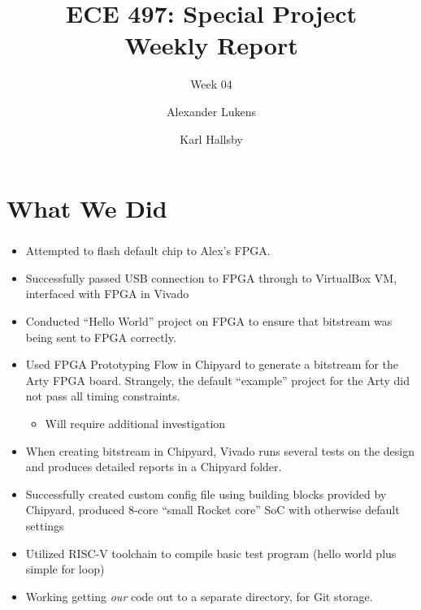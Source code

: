 \documentclass{../weeklyslides}
\title[Weekly Report]{ECE 497: Special Project \\ Weekly Report}
\subtitle{Week 04}
\author{Alexander Lukens \and Karl Hallsby}
\institute{Illinois Institute of Technology}
\date{\DTMdisplaydate{2021}{2}{18}{-1}}
\begin{document}
\nocite{chipyard}

\begin{frame}
  \titlepage{}
\end{frame}

\section{What We Did}\label{sec:What_We_Did}
\begin{frame}
  \frametitle{}
  \begin{itemize}
  \item Attempted to flash default chip to Alex's FPGA.\@
  \item Successfully passed USB connection to FPGA through to VirtualBox VM, interfaced with FPGA in Vivado
  \item Conducted ``Hello World'' project on FPGA to ensure that bitstream was being sent to FPGA correctly.
  \item Used FPGA Prototyping Flow in Chipyard to generate a bitstream for the Arty FPGA board.
    Strangely, the default ``example'' project for the Arty did not pass all timing constraints.
    \begin{itemize}
    \item Will require additional investigation
    \end{itemize}
  \item When creating bitstream in Chipyard, Vivado runs several tests on the design and produces detailed reports in a Chipyard folder.
  \end{itemize}
\end{frame}

\begin{frame}
  \begin{itemize}
  \item Successfully created custom config file using building blocks provided by Chipyard, produced 8-core ``small Rocket core'' SoC with otherwise default settings
  \item Utilized RISC-V toolchain to compile basic test program (hello world plus simple for loop)
  \item Working getting \emph{our} code out to a separate directory, for Git storage.
  \end{itemize}
\end{frame}
\end{document}
